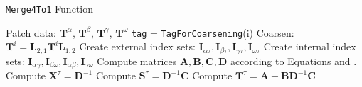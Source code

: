 \begin{algorithm}[H]
    \caption{\texttt{Merge4To1} Function}
    \begin{algorithmic}[0]
        \Require Patch data: $\textbf{T}^{\alpha}$, $\textbf{T}^{\beta}$, $\textbf{T}^{\gamma}$, $\textbf{T}^{\omega}$
         
            \State \texttt{tag} = \texttt{TagForCoarsening}(i)
                \State Coarsen: $\textbf{T}^{i} = \textbf{L}_{2,1} \textbf{T}^{i} \textbf{L}_{1,2}$
            \EndIf
        \EndFor
        \State Create external index sets: $\textbf{I}_{\alpha \tau}, \textbf{I}_{\beta \tau}, \textbf{I}_{\gamma \tau}, \textbf{I}_{\omega \tau}$ 
        \State Create internal index sets: $\textbf{I}_{\alpha \gamma}, \textbf{I}_{\beta \omega}, \textbf{I}_{\alpha \beta}, \textbf{I}_{\gamma \omega}$ 
        \State Compute matrices $\textbf{A}, \textbf{B}, \textbf{C}, \textbf{D}$ according to Equations  and . 
        \State {}
        \State Compute $\textbf{X}^{\tau} = \textbf{D}^{-1}$
        \State Compute $\textbf{S}^{\tau} = \textbf{D}^{-1} \textbf{C}$
        \State Compute $\textbf{T}^{\tau} = \textbf{A} - \textbf{B} \textbf{D}^{-1} \textbf{C}$
    \end{algorithmic}
    \label{alg:build_merge}
\end{algorithm}

